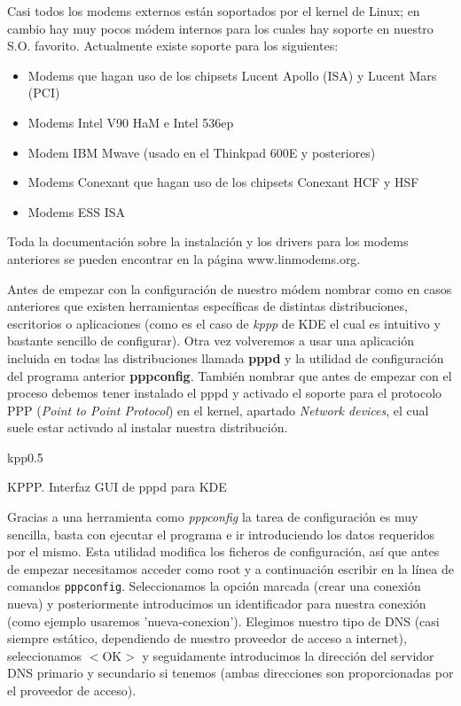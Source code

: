 Casi  todos los  modems externos  están  soportados por  el kernel  de
Linux; en  cambio hay  muy pocos  módem internos  para los  cuales hay
soporte en nuestro S.O. favorito.  Actualmente existe soporte para los
siguientes:

\begin{itemize}
\item Modems que hagan uso de los chipsets Lucent Apollo (ISA) y Lucent Mars (PCI)
\item Modems Intel V90 HaM e Intel 536ep
\item Modem IBM Mwave (usado en el Thinkpad 600E y posteriores)
\item Modems Conexant que hagan uso de los chipsets Conexant HCF y HSF
\item Modems ESS ISA
\end{itemize}

Toda  la documentación  sobre la  instalación y  los drivers  para los
modems anteriores se pueden encontrar en la página www.linmodems.org.

Antes de empezar con la configuración de nuestro módem nombrar como en
casos  anteriores que  existen herramientas  específicas de  distintas
distribuciones, escritorios  o aplicaciones (como  es el caso  de {\em
kppp} de KDE el cual es  intuitivo y bastante sencillo de configurar).
Otra  vez volveremos  a  usar  una aplicación  incluida  en todas  las
distribuciones llamada {\bf  pppd} y la utilidad  de configuración del
programa  anterior  {\bf  pppconfig}.  También nombrar  que  antes  de
empezar con el  proceso debemos tener instalado el pppd  y activado el
soporte para  el protocolo PPP ({\em  Point to Point Protocol})  en el
kernel, apartado {\em  Network devices}, el cual  suele estar activado
al instalar nuestra distribución.

\begin{figura}{kpp}{0.5}
\caption{KPPP. Interfaz GUI de pppd para KDE}
\end{figura}

Gracias  a   una  herramienta  como   {\em  pppconfig}  la   tarea  de
configuración es  muy sencilla,  basta con ejecutar  el programa  e ir
introduciendo  los  datos  requeridos  por  el  mismo.  Esta  utilidad
modifica  los ficheros  de  configuración, así  que  antes de  empezar
necesitamos acceder como root y a continuación escribir en la línea de
comandos {\tt  pppconfig}. Seleccionamos la opción  marcada (crear una
conexión nueva)  y posteriormente  introducimos un  identificador para
nuestra  conexión (como  ejemplo usaremos  'nueva-conexion'). Elegimos
nuestro tipo  de DNS  (casi siempre  estático, dependiendo  de nuestro
proveedor de acceso a internet), seleccionamos $<$OK$>$ y seguidamente
introducimos la  dirección del servidor  DNS primario y  secundario si
tenemos  (ambas direcciones  son  proporcionadas por  el proveedor  de
acceso).

